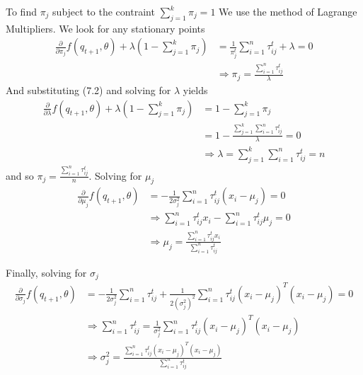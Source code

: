 \documentclass[paper=a4, fontsize=11pt]{scrartcl} %
\numberwithin{equation}{section} %
\numberwithin{figure}{section} %
\numberwithin{table}{section} %
\begin{document}
To find \(\pi_j\) subject to the contraint \(\sum_{j=1}^k \pi_j = 1\) We use the method of Lagrange Multipliers. We look for any stationary points
\begin{align}
\frac{\partial}{\partial \pi_j}f(q_{t+1},\theta) + \lambda\left(1-\sum_{j=1}^k \pi_j\right) &= \frac{1}{\pi_j^t}\sum_{i=1}^{n}\tau_{ij}^{t} + \lambda = 0 \\
&\Rightarrow \pi_j = \frac{\sum_{i=1}^{n}\tau_{ij}^{t}}{\lambda}
\end{align}
And substituting (7.2) and solving for \(\lambda\) yields
\begin{align}
\frac{\partial}{\partial \lambda}f(q_{t+1},\theta) + \lambda\left(1-\sum_{j=1}^k \pi_j\right) &= 1-\sum_{j=1}^k \pi_j \\
&= 1 - \frac{\sum_{j=1}^{k}\sum_{i=1}^{n}\tau_{ij}^{t}}{\lambda}=0\\
&\Rightarrow \lambda = \sum_{j=1}^{k}\sum_{i=1}^{n}\tau_{ij}^{t} = n
\end{align}
and so \(\pi_j= \frac{\sum_{i=1}^{n}\tau_{ij}^{t}}{n}\). Solving for \(\mu_j\)
\begin{align}
\frac{\partial}{\partial \mu_j}f(q_{t+1},\theta) &= -\frac{1}{2\sigma_j^2}\sum_{i=1}^n \tau_{ij}^{t}(x_i - \mu_j) = 0 \\
&\Rightarrow \sum_{i=1}^n \tau_{ij}^{t}x_i - \sum_{i=1}^n\tau_{ij}^{t}\mu_j = 0\\
&\Rightarrow \mu_j = \frac{\sum_{i=1}^n \tau_{ij}^{t}x_i}{\sum_{i=1}^n\tau_{ij}^{t}}
\end{align}

Finally, solving for \(\sigma_j\)
\begin{align}
\frac{\partial}{\partial \sigma_j}f(q_{t+1},\theta) &= -\frac{1}{2\sigma_j^2}\sum_{i=1}^n \tau_{ij}^{t} + \frac{1}{2(\sigma_j^2)^2}\sum_{i=1}^n \tau_{ij}^{t}(x_i-\mu_j)^T(x_i-\mu_j)=0\\
&\Rightarrow \sum_{i=1}^n \tau_{ij}^{t} = \frac{1}{\sigma_j^2}\sum_{i=1}^n \tau_{ij}^{t}(x_i-\mu_j)^T(x_i-\mu_j) \\
&\Rightarrow \sigma_j^2 = \frac{\sum_{i=1}^n \tau_{ij}^{t}(x_i-\mu_j)^T(x_i-\mu_j)}{\sum_{i=1}^n \tau_{ij}^{t}}
\end{align}
\end{document}
